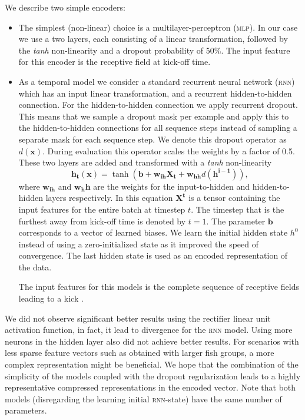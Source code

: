 \documentclass[nobib, a4paper]{tufte-handout}
\begin{document}
We describe two simple encoders:
\begin{itemize}
\item The simplest (non-linear) choice is a multilayer-perceptron (\textsc{mlp}).
  In our case we use a two layers, each consisting of a linear transformation, followed by the \textit{tanh} non-linearity and a dropout probability of 50\%\autocite{dropout}.
  The input feature for this encoder is the receptive field at kick-off time.
\item
  As a temporal model we consider a standard recurrent neural network (\textsc{rnn}) which has an input linear transformation, and a recurrent hidden-to-hidden connection.
  For the hidden-to-hidden connection we apply recurrent dropout\autocite{recurrentDropout}.
  This means that we sample a dropout mask per example and apply this to the hidden-to-hidden connections for all sequence steps instead of sampling a separate mask for each sequence step.
  We denote this dropout operator as \(d(\bm{x})\).
  During evaluation this operator scales the weights by a factor of 0.5.
  These two layers are added and transformed with a \textit{tanh} non-linearity
  \begin{equation*}
    \bm{h_t} (\bm{x}) = \operatorname{tanh} \left( \bm{b} + \bm{w_{ih}} \bm{X_t} + \bm{w_{hh}} d (\bm{h^{i-1}}) \right),
  \end{equation*}
  where \(\bm{w_{ih}}\) and \(\bm{w_hh}\) are the weights for the input-to-hidden and hidden-to-hidden layers respectively.
  In this equation $\bm{X^t}$ is a tensor containing the input features for the entire batch at timestep \(t\).
  The timestep that is the furthest away from kick-off time is denoted by $t = 1$.
  The parameter \(\bm{b}\) corresponds to a vector of learned biases.
  We learn the initial hidden state \(h^0\) instead of using a zero-initialized state as it improved the speed of convergence.
  The last hidden state is used as an encoded representation of the data.

  The input features for this models is the complete sequence of receptive fields leading to a kick%
  .
\end{itemize}
We did not observe significant better results using the rectifier linear unit activation function, in fact, it lead to divergence for the \textsc{rnn} model.
Using more neurons in the hidden layer also did not achieve better results.
For scenarios with less sparse feature vectors such as obtained with larger fish groups, a more complex representation might be beneficial.
We hope that the combination of the simplicity of the models coupled with the dropout regularization leads to a highly representative compressed representations in the encoded vector.
Note that both models (disregarding the learning initial \textsc{rnn}-state) have the same number of parameters.
\end{document}
